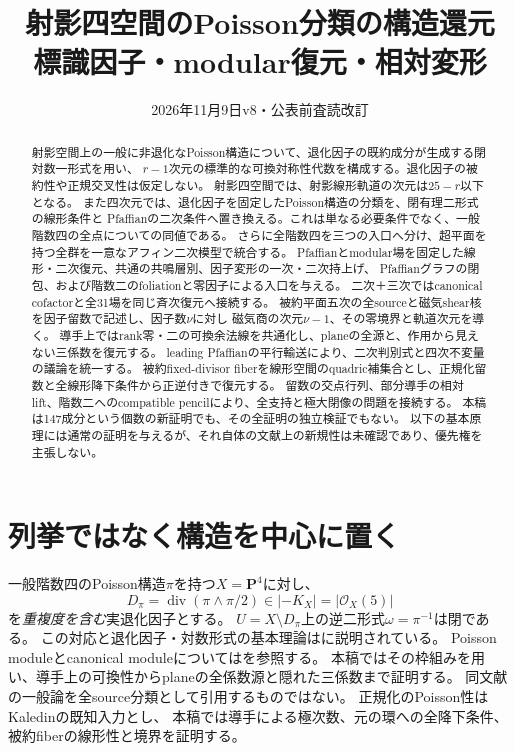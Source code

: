 \documentclass[a4paper,11pt]{ltjsarticle}
\title{射影四空間のPoisson分類の構造還元\\\large 標識因子・modular復元・相対変形}
\author{}
\date{2026年11月9日\quad v8・公表前査読改訂}
\theoremstyle{definition}
\theoremstyle{definition}\newtheorem{definition}[theorem]{定義}
\theoremstyle{remark}\newtheorem{remark}[theorem]{注意}
\newcommand{\PP}{\mathbf P}\newcommand{\CC}{\mathbf C}
\newcommand{\cO}{\mathcal O}\newcommand{\cP}{\mathcal P}
\begin{document}
\maketitle
\begin{abstract}
射影空間上の一般に非退化なPoisson構造について、退化因子の既約成分が生成する閉対数一形式を用い、
$r-1$次元の標準的な可換対称性代数を構成する。退化因子の被約性や正規交叉性は仮定しない。
射影四空間では、射影線形軌道の次元は$25-r$以下となる。
また四次元では、退化因子を固定したPoisson構造の分類を、閉有理二形式の線形条件と
Pfaffianの二次条件へ置き換える。これは単なる必要条件でなく、一般階数四の全点についての同値である。
さらに全階数四を三つの入口へ分け、超平面を持つ全群を一意なアフィン二次模型で統合する。
Pfaffianとmodular場を固定した線形・二次復元、共通の共鳴層別、因子変形の一次・二次持上げ、
Pfaffianグラフの閉包、および階数二のfoliationと零因子による入口を与える。
二次＋三次ではcanonical cofactorと全31場を同じ斉次復元へ接続する。
被約平面五次の全sourceと磁気shear核を因子留数で記述し、因子数$\nu$に対し
磁気商の次元$\nu-1$、その零境界と軌道次元を導く。
導手上ではrank零・二の可換余法線を共通化し、planeの全源と、作用から見えない三係数を復元する。
leading Pfaffianの平行輸送により、二次判別式と四次不変量の議論を統一する。
被約fixed-divisor fiberを線形空間のquadric補集合とし、正規化留数と全線形降下条件から正逆付きで復元する。
留数の交点行列、部分導手の相対lift、階数二へのcompatible pencilにより、全支持と極大閉像の問題を接続する。
本稿は147成分という個数の新証明でも、その全証明の独立検証でもない。
以下の基本原理には通常の証明を与えるが、それ自体の文献上の新規性は未確認であり、優先権を主張しない。
\end{abstract}

\section{列挙ではなく構造を中心に置く}
一般階数四のPoisson構造$\pi$を持つ$X=\PP^4$に対し、
\[
 D_\pi=\operatorname{div}(\pi\wedge\pi/2)\in|-K_X|=|\cO_X(5)|
\]
を\emph{重複度を含む}実退化因子とする。
$U=X\setminus D_\pi$上の逆二形式$\omega=\pi^{-1}$は閉である。
この対応と退化因子・対数形式の基本理論は\cite[\S5]{Pym}に説明されている。
Poisson moduleとcanonical moduleについては\cite[\S4.1, Example 4.4]{GPconductor}を参照する。
本稿ではその枠組みを用い、導手上の可換性からplaneの全係数源と隠れた三係数まで証明する。
同文献の一般論を全source分類として引用するものではない。
正規化のPoisson性はKaledin\cite[Theorem 1.5]{KaledinNormalization}の既知入力とし、
本稿では導手による極次数、元の環への全降下条件、被約fiberの線形性と境界を証明する。
\end{document}
